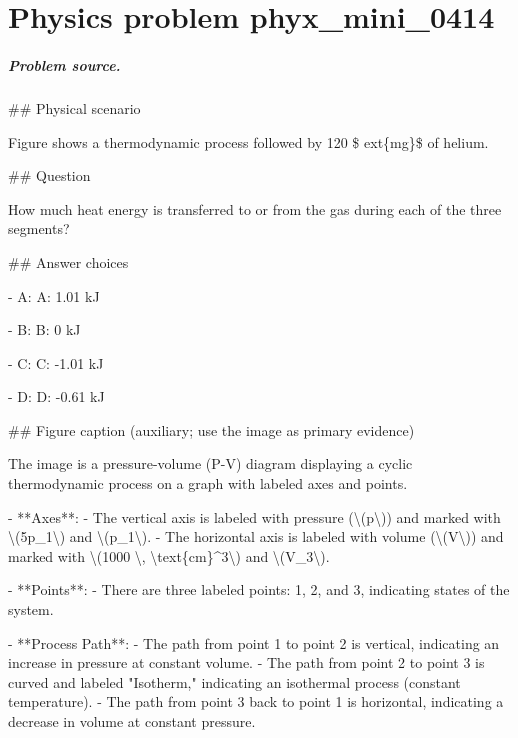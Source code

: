 
\chapter{Physics problem phyx\_mini\_0414}
\label{ch:PhyXMiniProblems_problem_phyx_mini_0414}

\paragraph{Problem source.}
\#\# Physical scenario

Figure shows a thermodynamic process followed by 120 \$	ext\{mg\}\$ of helium.

\#\# Question

How much heat energy is transferred to or from the gas during each of the three segments?

\#\# Answer choices

- A: A: 1.01 kJ

- B: B: 0 kJ

- C: C: -1.01 kJ

- D: D: -0.61 kJ

\#\# Figure caption (auxiliary; use the image as primary evidence)

The image is a pressure-volume (P-V) diagram displaying a cyclic thermodynamic process on a graph with labeled axes and points.

- **Axes**: 
  - The vertical axis is labeled with pressure (\textbackslash{}(p\textbackslash{})) and marked with \textbackslash{}(5p\_1\textbackslash{}) and \textbackslash{}(p\_1\textbackslash{}).
  - The horizontal axis is labeled with volume (\textbackslash{}(V\textbackslash{})) and marked with \textbackslash{}(1000 \textbackslash{}, \textbackslash{}text\{cm\}\textasciicircum{}3\textbackslash{}) and \textbackslash{}(V\_3\textbackslash{}).

- **Points**:
  - There are three labeled points: 1, 2, and 3, indicating states of the system.
  
- **Process Path**:
  - The path from point 1 to point 2 is vertical, indicating an increase in pressure at constant volume.
  - The path from point 2 to point 3 is curved and labeled "Isotherm," indicating an isothermal process (constant temperature).
  - The path from point 3 back to point 1 is horizontal, indicating a decrease in volume at constant pressure.
  

